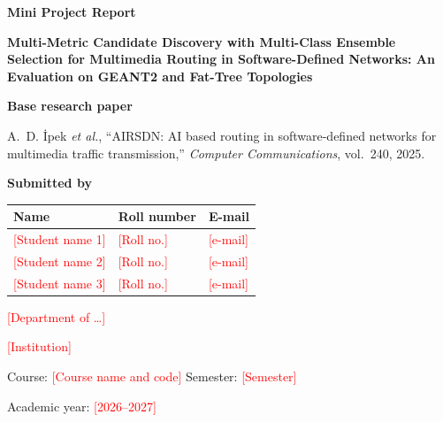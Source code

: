 \documentclass[conference,a4paper]{IEEEtran}
\newcommand{\tofill}[1]{\textcolor{red}{[#1]}}
\begin{document}
\onecolumn
\thispagestyle{empty}
\begin{center}
\vspace*{1.5cm}
{\Large\bfseries Mini Project Report\par}
\vspace{1.2cm}
{\LARGE\bfseries Multi-Metric Candidate Discovery with Multi-Class Ensemble Selection for Multimedia Routing in
Software-Defined Networks: An Evaluation on GEANT2 and Fat-Tree Topologies\par}
\vspace{1.4cm}
{\large\bfseries Base research paper\par}
\vspace{0.3cm}
{\large A.~D. \.{I}pek \textit{et al.}, ``AIRSDN: AI based routing in software-defined networks for multimedia
traffic transmission,'' \textit{Computer Communications}, vol.~240, 2025.\par}
\vspace{1.6cm}
{\large\bfseries Submitted by\par}
\vspace{0.3cm}
\begin{tabular}{lll}
\toprule
Name & Roll number & E-mail \\
\midrule
\tofill{Student name 1} & \tofill{Roll no.} & \tofill{e-mail} \\
\tofill{Student name 2} & \tofill{Roll no.} & \tofill{e-mail} \\
\tofill{Student name 3} & \tofill{Roll no.} & \tofill{e-mail} \\
\bottomrule
\end{tabular}
\vspace{1.6cm}

{\large \tofill{Department of \ldots}\par}
{\large \tofill{Institution}\par}
\vspace{0.6cm}
{\large Course: \tofill{Course name and code} \quad Semester: \tofill{Semester}\par}
\vspace{0.3cm}
{\large Academic year: \tofill{2026--2027}\par}
\end{center}
\clearpage
\twocolumn
\setcounter{page}{1}
\end{document}

